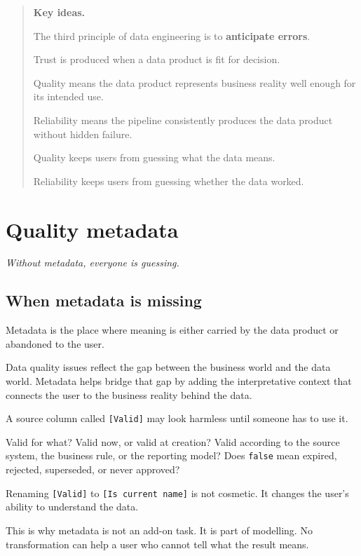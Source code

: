 \documentclass[10pt,openany,10pt]{book}
\begin{document}
\begin{quote}
\textbf{Key ideas.}

The third principle of data engineering is to \textbf{anticipate
errors}.

Trust is produced when a data product is fit for decision.

Quality means the data product represents business reality well enough
for its intended use.

Reliability means the pipeline consistently produces the data product
without hidden failure.

Quality keeps users from guessing what the data means.

Reliability keeps users from guessing whether the data worked.
\end{quote}

\newpage

\chapter{Quality
metadata}\label{docs-quality-reliability-quality-metadata}

\emph{Without metadata, everyone is guessing.}

\section{When metadata is missing}\label{when-metadata-is-missing}

Metadata is the place where meaning is either carried by the data
product or abandoned to the user.

Data quality issues reflect the gap between the business world and the
data world. Metadata helps bridge that gap by adding the interpretative
context that connects the user to the business reality behind the data.

A source column called \texttt{{[}Valid{]}} may look harmless until
someone has to use it.

Valid for what? Valid now, or valid at creation? Valid according to the
source system, the business rule, or the reporting model? Does
\texttt{false} mean expired, rejected, superseded, or never approved?

Renaming \texttt{{[}Valid{]}} to \texttt{{[}Is\ current\ name{]}} is not
cosmetic. It changes the user's ability to understand the data.

This is why metadata is not an add-on task. It is part of modelling. No
transformation can help a user who cannot tell what the result means.
\end{document}
